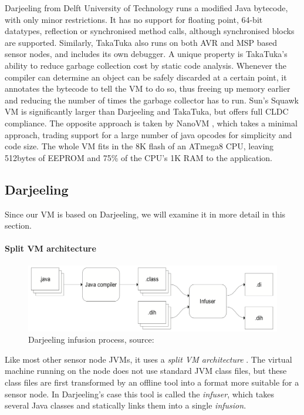 Darjeeling \cite{Brouwers:2009cj} from Delft University of Technology runs a modified Java bytecode, with only minor restrictions. It has no support for floating point, 64-bit datatypes, reflection or synchronised method calls, although synchronised blocks are supported. Similarly, TakaTuka \cite{Aslam:2008} also runs on both AVR and MSP based sensor nodes, and includes its own debugger. A unique property is TakaTuka's ability to reduce garbage collection cost by static code analysis. Whenever the compiler can determine an object can be safely discarded at a certain point, it annotates the bytecode to tell the VM to do so, thus freeing up memory earlier and reducing the number of times the garbage collector has to run. Sun's Squawk VM \cite{Shaylor:2003ws} is significantly larger than Darjeeling and TakaTuka, but offers full CLDC compliance. The opposite approach is taken by NanoVM \cite{Harbaum}, which takes a minimal approach, trading support for a large number of java opcodes for simplicity and code size. The whole VM fits in the 8K flash of an ATmega8 CPU, leaving 512bytes of EEPROM and 75\% of the CPU's 1K RAM to the application.

\subsection{Darjeeling}
Since our VM is based on Darjeeling, we will examine it in more detail in this section.

\paragraph{Split VM architecture}
\begin{figure}
\centering
\includegraphics[width=0.6\linewidth]{darjeeling-infusion-process}
\caption[Darjeeling infusion process]{Darjeeling infusion process, source: \cite{Brouwers:2009cj}}
\label{fig-darjeeling-infusion-process}
\end{figure}
Like most other sensor node JVMs, it uses a \emph{split VM architecture} \cite{Simon:2006wd}. The virtual machine running on the node does not use standard JVM class files, but these class files are first transformed by an offline tool into a format more suitable for a sensor node. In Darjeeling's case this tool is called the \emph{infuser}, which takes several Java classes and statically links them into a single \emph{infusion}.

